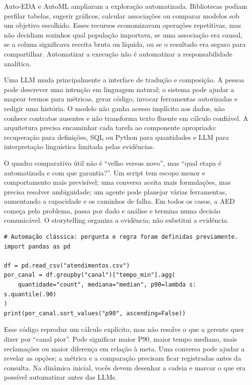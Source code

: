 Auto-EDA e AutoML ampliaram a exploração automatizada. Bibliotecas podiam perfilar tabelas, sugerir gráficos, calcular associações ou comparar modelos sob um objetivo escolhido. Esses recursos economizavam operações repetitivas, mas não decidiam sozinhos qual população importava, se uma associação era causal, se a coluna significava receita bruta ou líquida, ou se o resultado era seguro para compartilhar. Automatizar a execução não é automatizar a responsabilidade analítica.

Uma LLM muda principalmente a interface de tradução e composição. A pessoa pode descrever uma intenção em linguagem natural; o sistema pode ajudar a mapear termos para métricas, gerar código, invocar ferramentas autorizadas e redigir uma história. O modelo não ganha acesso implícito aos dados, não conhece contratos ausentes e não transforma texto fluente em cálculo confiável. A arquitetura precisa encaminhar cada tarefa ao componente apropriado: recuperação para definições, SQL ou Python para quantidades e LLM para interpretação linguística limitada pelas evidências.

O quadro comparativo útil não é ``velho versus novo'', mas ``qual etapa é automatizada e com que garantia?''. Um script tem escopo menor e comportamento mais previsível; uma conversa aceita mais formulações, mas precisa resolver ambiguidade; um agente pode planejar várias ferramentas, aumentando a capacidade e os caminhos de falha. Em todos os casos, a AED começa pelo problema, passa por dado e análise e termina numa decisão comunicável. O storytelling organiza a evidência; não substitui a evidência.

\begin{verbatim}
# Automação clássica: pergunta e regra foram definidas previamente.
import pandas as pd

df = pd.read_csv("atendimentos.csv")
por_canal = df.groupby("canal")["tempo_min"].agg(
    quantidade="count", mediana="median", p90=lambda s: s.quantile(.90)
)
print(por_canal.sort_values("p90", ascending=False))
\end{verbatim}

Esse código reproduz um cálculo explícito, mas não resolve o que a gerente quer dizer por ``canal pior''. Pode significar maior P90, maior tempo mediano, mais reclamações ou maior diferença em relação à meta. Uma conversa pode ajudar a revelar as opções; a métrica e a comparação precisam ficar registradas antes da consulta. Na dinâmica inicial, vocês devem desenhar a cadeia e marcar o que era possível automatizar antes das LLMs.

